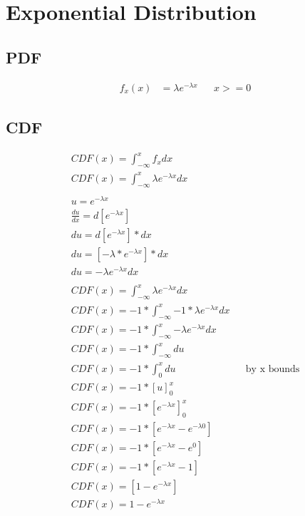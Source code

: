 \documentclass[]{book}
\begin{document}
\pagebreak
\section {Exponential Distribution}

\subsection{PDF}
\begin{align*}
f_x(x) &= \lambda e^{-\lambda x} && x >= 0
\end{align*}

\subsection{CDF}
\begin{align*}
	CDF(x) = \int_{-\infty}^{x} {f_xdx}\\
	CDF(x) = \int_{-\infty}^{x} {\lambda e^{-\lambda x}dx}\\
	\\
	u = e^{-\lambda x}\\
	\frac{du}{dx} = d[e^{-\lambda x}]\\
	du = d[e^{-\lambda x}]*dx\\
	du = [-\lambda * e^{-\lambda x}]*dx\\
	du = -\lambda e^{-\lambda x}dx\\
	\\
	CDF(x) = \int_{-\infty}^{x} {\lambda e^{-\lambda x}dx}\\
	CDF(x) = -1*\int_{-\infty}^{x} {-1*\lambda e^{-\lambda x}dx}\\
	CDF(x) = -1*\int_{-\infty}^{x} {-\lambda e^{-\lambda x}dx}\\
	CDF(x) = -1*\int_{-\infty}^{x} {du}\\
	CDF(x) = -1*\int_{0}^{x} {du} && \text{by x bounds}\\
	CDF(x) = -1*[u]_{0}^{x}\\
	CDF(x) = -1*[e^{-\lambda x}]_{0}^{x}\\
	CDF(x) = -1*[e^{-\lambda x} - e^{-\lambda 0}]\\
	CDF(x) = -1*[e^{-\lambda x} - e^{0}]\\
	CDF(x) = -1*[e^{-\lambda x} - 1]\\
	CDF(x) = [1 - e^{-\lambda x}]\\
	CDF(x) = 1 - e^{-\lambda x}\\
\end{align*}
\end{document}
